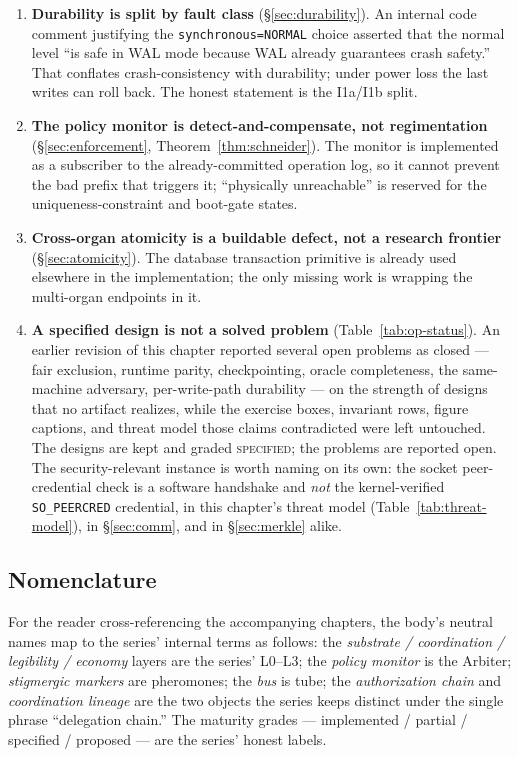 \documentclass[11pt,a4paper]{article}
\newcommand{\Designed}{{\textcolor{hhgray}{\textsc{specified}}}}
\theoremstyle{definition}
\theoremstyle{remark}
\begin{document}
\begin{enumerate}[leftmargin=1.6em]
\item \textbf{Durability is split by fault class} (\S\ref{sec:durability}). An
internal code comment justifying the \texttt{synchronous=NORMAL} choice asserted
that the normal level ``is safe in WAL mode because WAL already guarantees crash
safety.'' That conflates crash-consistency with durability; under power loss the
last writes can roll back. The honest statement is the I1a/I1b split.
\item \textbf{The policy monitor is detect-and-compensate, not regimentation}
(\S\ref{sec:enforcement}, Theorem~\ref{thm:schneider}). The monitor is implemented
as a subscriber to the already-committed operation log, so it cannot prevent the
bad prefix that triggers it; ``physically unreachable'' is reserved for the
uniqueness-constraint and boot-gate states.
\item \textbf{Cross-organ atomicity is a buildable defect, not a research frontier}
(\S\ref{sec:atomicity}). The database transaction primitive is already used
elsewhere in the implementation; the only missing work is wrapping the multi-organ
endpoints in it.
\item \textbf{A specified design is not a solved problem}
(Table~\ref{tab:op-status}). An earlier revision of this chapter reported several
open problems as closed --- fair exclusion, runtime parity, checkpointing, oracle
completeness, the same-machine adversary, per-write-path durability --- on the
strength of designs that no artifact realizes, while the exercise boxes, invariant
rows, figure captions, and threat model those claims contradicted were left
untouched. The designs are kept and graded \Designed; the problems are reported
open. The security-relevant instance is worth naming on its own: the socket
peer-credential check is a software handshake and \emph{not} the kernel-verified
\texttt{SO\_PEERCRED} credential, in this chapter's threat model
(Table~\ref{tab:threat-model}), in \S\ref{sec:comm}, and in \S\ref{sec:merkle}
alike.
\end{enumerate}

\subsection{Nomenclature}

For the reader cross-referencing the accompanying chapters, the body's neutral names map
to the series' internal terms as follows: the \emph{substrate / coordination /
legibility / economy} layers are the series' L0--L3; the \emph{policy monitor} is
the Arbiter; \emph{stigmergic markers} are pheromones; the \emph{bus} is tube; the
\emph{authorization chain} and \emph{coordination lineage} are the two objects the
series keeps distinct under the single phrase ``delegation chain.'' The maturity
grades --- implemented / partial / specified / proposed --- are the series' honest
labels.
\end{document}
